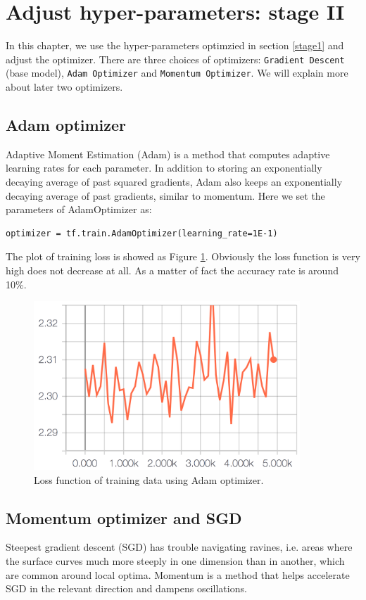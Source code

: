 \documentclass[11pt]{article}
\begin{document}
\clearpage
\section{Adjust hyper-parameters: stage II}
\label{stage2}
In this chapter, we use the hyper-parameters optimzied in section \ref{stage1} and adjust the optimizer. There are three choices of optimizers: {\tt Gradient Descent} (base model), {\tt Adam Optimizer} and {\tt Momentum Optimizer}. We will explain more about later two optimizers.



\subsection{Adam optimizer}
Adaptive Moment Estimation (Adam) is a method that computes adaptive learning rates for each parameter. In addition to storing an exponentially decaying average of past squared gradients, Adam also keeps an exponentially decaying average of past gradients, similar to momentum.
Here we set the parameters of AdamOptimizer as: 

\begin{lstlisting}
optimizer = tf.train.AdamOptimizer(learning_rate=1E-1)
\end{lstlisting}


The plot of training loss is showed as Figure \ref{fig:adam}. Obviously the loss function is very high does not decrease at all.  As a matter of fact the accuracy rate is around 10\%.


\begin{figure}[!htb]
   \centering
   \includegraphics[width=10cm]{images/optimizer-adam.png} %
   \caption{Loss function of training data using Adam optimizer.}
   \label{fig:adam}
\end{figure}



\subsection{Momentum optimizer and SGD}
Steepest gradient descent (SGD) has trouble navigating ravines, i.e. areas where the surface curves much more steeply in one dimension than in another, which are common around local optima. Momentum is a method that helps accelerate SGD in the relevant direction and dampens oscillations. 
\end{document}
